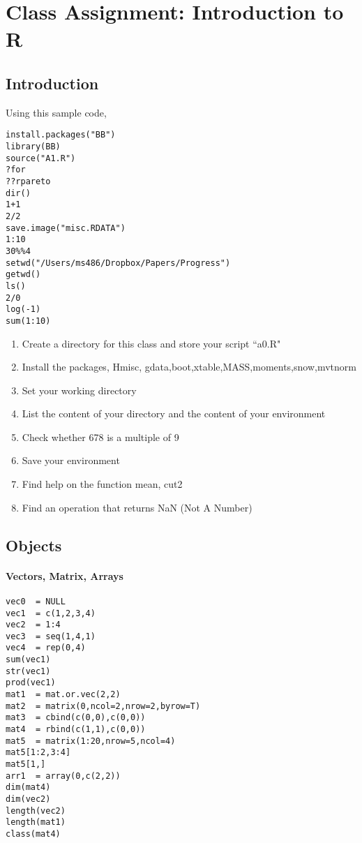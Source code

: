 \documentclass[11pt,a4paper]{article}
\newcommand{\1}{\mathbb{1}}
\begin{document}
\doublespacing

\section{Class Assignment: Introduction to R}

\subsection{Introduction}

Using this sample code, 

\begin{verbatim}
install.packages("BB")
library(BB)
source("A1.R")
?for
??rpareto
dir()
1+1
2/2
save.image("misc.RDATA")
1:10
30%%4
setwd("/Users/ms486/Dropbox/Papers/Progress")
getwd()
ls()
2/0
log(-1)
sum(1:10)
\end{verbatim}

\begin{Exercise}[title=Introduction]
\begin{enumerate}
\item Create a directory for this class and store your script ``a0.R" 
\item Install the packages, Hmisc, gdata,boot,xtable,MASS,moments,snow,mvtnorm
\item Set your working directory
\item List the content of your directory and the content of your environment
\item Check whether 678 is a multiple of 9
\item Save your environment
\item Find help on the function mean, cut2
\item Find an operation that returns NaN (Not A Number)
\end{enumerate}
\end{Exercise}

\subsection{Objects}

\paragraph{Vectors, Matrix, Arrays}
\begin{verbatim}
vec0  = NULL
vec1  = c(1,2,3,4)
vec2  = 1:4
vec3  = seq(1,4,1)
vec4  = rep(0,4)
sum(vec1)
str(vec1)
prod(vec1)
mat1  = mat.or.vec(2,2)
mat2  = matrix(0,ncol=2,nrow=2,byrow=T)
mat3  = cbind(c(0,0),c(0,0))
mat4  = rbind(c(1,1),c(0,0))
mat5  = matrix(1:20,nrow=5,ncol=4)
mat5[1:2,3:4]
mat5[1,]
arr1  = array(0,c(2,2))
dim(mat4)
dim(vec2)
length(vec2)
length(mat1)
class(mat4)
\end{verbatim}
\end{document}
